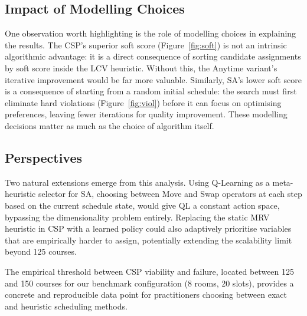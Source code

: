 \documentclass[letterpaper]{article}
\begin{document}
\subsection{Impact of Modelling Choices}

One observation worth highlighting is the role of modelling choices in explaining the results. The CSP's superior soft score (Figure~\ref{fig:soft}) is not an intrinsic algorithmic advantage: it is a direct consequence of sorting candidate assignments by soft score inside the LCV heuristic. Without this, the Anytime variant's iterative improvement would be far more valuable. Similarly, SA's lower soft score is a consequence of starting from a random initial schedule: the search must first eliminate hard violations (Figure~\ref{fig:viol}) before it can focus on optimising preferences, leaving fewer iterations for quality improvement. These modelling decisions matter as much as the choice of algorithm itself.

\subsection{Perspectives}

Two natural extensions emerge from this analysis. Using Q-Learning as a meta-heuristic selector for SA, choosing between Move and Swap operators at each step based on the current schedule state, would give QL a constant action space, bypassing the dimensionality problem entirely. Replacing the static MRV heuristic in CSP with a learned policy could also adaptively prioritise variables that are empirically harder to assign, potentially extending the scalability limit beyond 125 courses.

The empirical threshold between CSP viability and failure, located between 125 and 150 courses for our benchmark configuration (8 rooms, 20 slots), provides a concrete and reproducible data point for practitioners choosing between exact and heuristic scheduling methods.

\nocite{russell2020,claude}

\end{document}

